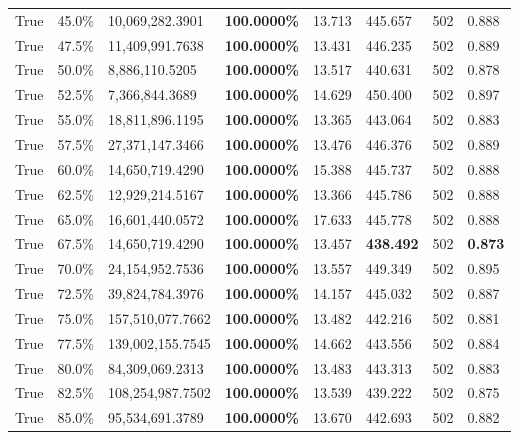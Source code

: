 \begin{table}[H]
{\begin{tabular}{lllrllll}
\cline{1-8}
True & 45.0\% & 10,069,282.3901 & \bfseries \color{red} 100.0000\% & 13.713 & 445.657 & 502 & 0.888 \\
\cline{1-8}
True & 47.5\% & 11,409,991.7638 & \bfseries \color{red} 100.0000\% & 13.431 & 446.235 & 502 & 0.889 \\
\cline{1-8}
True & 50.0\% & 8,886,110.5205 & \bfseries \color{red} 100.0000\% & 13.517 & 440.631 & 502 & 0.878 \\
\cline{1-8}
True & 52.5\% & 7,366,844.3689 & \bfseries \color{red} 100.0000\% & 14.629 & 450.400 & 502 & 0.897 \\
\cline{1-8}
True & 55.0\% & 18,811,896.1195 & \bfseries \color{red} 100.0000\% & 13.365 & 443.064 & 502 & 0.883 \\
\cline{1-8}
True & 57.5\% & 27,371,147.3466 & \bfseries \color{red} 100.0000\% & 13.476 & 446.376 & 502 & 0.889 \\
\cline{1-8}
True & 60.0\% & 14,650,719.4290 & \bfseries \color{red} 100.0000\% & 15.388 & 445.737 & 502 & 0.888 \\
\cline{1-8}
True & 62.5\% & 12,929,214.5167 & \bfseries \color{red} 100.0000\% & 13.366 & 445.786 & 502 & 0.888 \\
\cline{1-8}
True & 65.0\% & 16,601,440.0572 & \bfseries \color{red} 100.0000\% & 17.633 & 445.778 & 502 & 0.888 \\
\cline{1-8}
True & 67.5\% & 14,650,719.4290 & \bfseries \color{red} 100.0000\% & 13.457 & \bfseries \color{red} 438.492 & 502 & \bfseries \color{red} 0.873 \\
\cline{1-8}
True & 70.0\% & 24,154,952.7536 & \bfseries \color{red} 100.0000\% & 13.557 & 449.349 & 502 & 0.895 \\
\cline{1-8}
True & 72.5\% & 39,824,784.3976 & \bfseries \color{red} 100.0000\% & 14.157 & 445.032 & 502 & 0.887 \\
\cline{1-8}
True & 75.0\% & 157,510,077.7662 & \bfseries \color{red} 100.0000\% & 13.482 & 442.216 & 502 & 0.881 \\
\cline{1-8}
True & 77.5\% & 139,002,155.7545 & \bfseries \color{red} 100.0000\% & 14.662 & 443.556 & 502 & 0.884 \\
\cline{1-8}
True & 80.0\% & 84,309,069.2313 & \bfseries \color{red} 100.0000\% & 13.483 & 443.313 & 502 & 0.883 \\
\cline{1-8}
True & 82.5\% & 108,254,987.7502 & \bfseries \color{red} 100.0000\% & 13.539 & 439.222 & 502 & 0.875 \\
\cline{1-8}
True & 85.0\% & 95,534,691.3789 & \bfseries \color{red} 100.0000\% & 13.670 & 442.693 & 502 & 0.882 \\

\end{tabular}}
\end{table}
